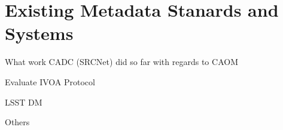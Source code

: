 \section{Existing Metadata Stanards and Systems}\label{sec:exist_mod}

What work CADC (SRCNet) did so far with regards to CAOM

Evaluate IVOA Protocol 

LSST DM

Others